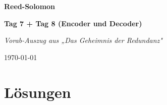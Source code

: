 \documentclass[
  11pt,
  a4paper,
  twoside,
  parskip=half,
  numbers=noenddot,
  open=right,
]{scrbook}
\begin{document}
\frontmatter

\begin{titlepage}
  \centering
  \vspace*{5cm}
  {\Huge\bfseries Reed-Solomon\par}
  \vspace{0.6cm}
  {\Large\bfseries Tag 7 + Tag 8 (Encoder und Decoder)\par}
  \vspace{1.2cm}
  {\Large\itshape Vorab-Auszug aus „Das Geheimnis der Redundanz"\par}
  \vfill
  {\large \today\par}
  \vspace*{1.5cm}
\end{titlepage}

\tableofcontents

\mainmatter
\setcounter{chapter}{6}



\appendix
\chapter*{Lösungen}


\end{document}
